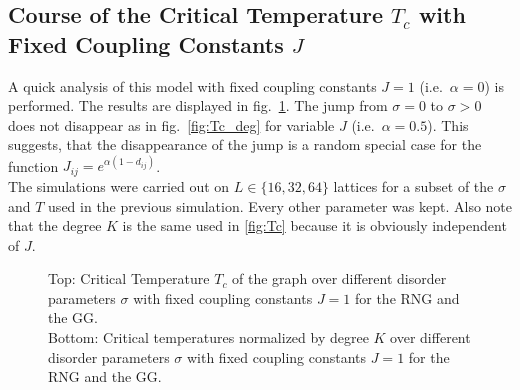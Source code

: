 \subsection{Course of the Critical Temperature $T_c$ with Fixed Coupling Constants $J$}
\label{appendix:fixedCoupling}
    A quick analysis of this model with fixed coupling constants \(J = 1\)
    (i.e.\ \(\alpha=0\)) is performed. The results are displayed in fig.\ \ref{fig:Tc_deg_A0}.
    The jump from \(\sigma=0\) to \(\sigma>0\) does not disappear as in fig.\ \ref{fig:Tc_deg}
    for variable \(J\) (i.e.\ \(\alpha=0.5\)). This suggests, that the
    disappearance of the jump is a random special case for the function
    \(J_{ij}=e^{\alpha(1-d_{ij})}\).\\
    The simulations were carried out on \(L \in \{16,32,64\}\) lattices
    for a subset of the \(\sigma\) and \(T\) used in the previous simulation.
    Every other parameter was kept. Also note that the degree \(K\) is
    the same used in \ref{fig:Tc}
    because it is obviously independent of \(J\).
    \begin{figure}[htbp]
        \centering


        \caption[Critical Temperature and Critical Temperature Normalized by Degree of the Graph for Fixed Coupling Constants $J=1$]
        {
            Top: Critical Temperature \(T_c\) of the graph over different
            disorder parameters \(\sigma\) with fixed coupling constants \(J=1\) for
             the RNG and
             the GG.\\
            Bottom: Critical temperatures normalized by degree \(K\) over
            different disorder parameters \(\sigma\) with fixed coupling constants \(J=1\) for
             the RNG and
             the GG.
        }
        \label{fig:Tc_deg_A0}
    \end{figure}\\

